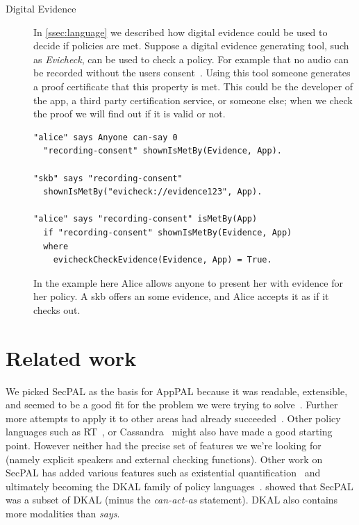 \documentclass[twoside,letterpaper]{soups}
\newcommand{\comment}[1]{}%
\begin{document}
\begin{description}
  \item[Digital Evidence]
    In \autoref{ssec:language} we described how digital evidence could be used to decide if policies are met.
    Suppose a digital evidence generating tool, such as \emph{Evicheck}, can be used to check a policy.
    For example that no audio can be recorded without the users consent~\citep{Seghir:2014uq}.
    Using this tool someone generates a proof certificate that this property is met.
    This could be the developer of the app, a third party certification service, or someone else;
      when we check the proof we will find out if it is valid or not.
    \begin{lstlisting}
"alice" says Anyone can-say 0
  "recording-consent" shownIsMetBy(Evidence, App).

"skb" says "recording-consent"
  shownIsMetBy("evicheck://evidence123", App).

"alice" says "recording-consent" isMetBy(App)
  if "recording-consent" shownIsMetBy(Evidence, App)
  where
    evicheckCheckEvidence(Evidence, App) = True.
    \end{lstlisting}
    In the example here Alice allows anyone to present her with evidence for her policy.
    A \ac{skb} offers an some evidence, and Alice accepts it as if it checks out.
\end{description}

\section{Related work \comment{1--2 pages}}

We picked SecPAL as the basis for AppPAL because it was readable, extensible, and seemed to be a good fit for the problem we were trying to solve~\citep{Hallett:2014un}.
Further more attempts to apply it to other areas had already succeeded~\citep{Aziz:2011vt,Humphrey:2007wc}.
Other policy languages such as RT~\citep{Li:2003ua}, or Cassandra~\citep{Becker:2004il} might also have made a good starting point.
However neither had the precise set of features we we're looking for (namely explicit speakers and external checking functions).
Other work on SecPAL has added various features such as existential quantification~\citep{Becker:2009vt} and ultimately becoming the DKAL family of policy languages~\citep{Gurevich:2008fz,Gurevich:Qo5E3M3}.
\citeauthor{Gurevich:2008fz} showed that SecPAL was a subset of DKAL (minus the \emph{can-act-as} statement).
DKAL also contains more modalities than \emph{says}.
\end{document}
